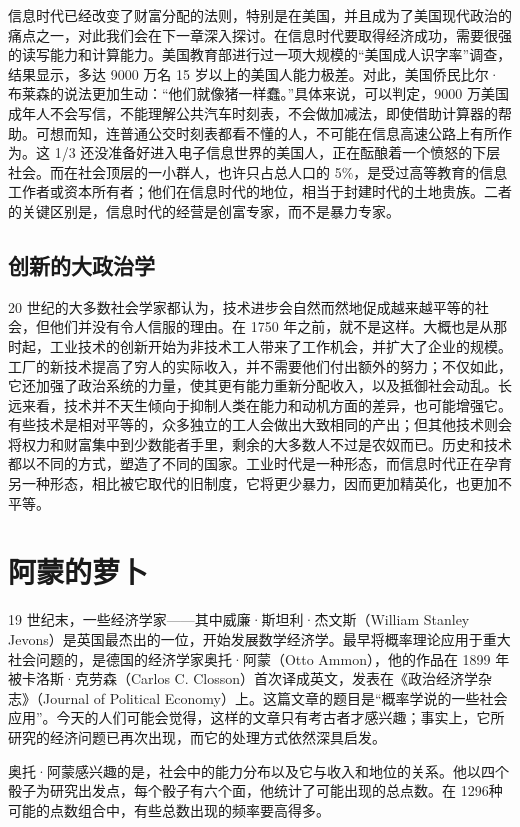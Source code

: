 信息时代已经改变了财富分配的法则，特别是在美国，并且成为了美国现代政治的痛点之一，对此我们会在下一章深入探讨。在信息时代要取得经济成功，需要很强的读写能力和计算能力。美国教育部进行过一项大规模的“美国成人识字率”调查，结果显示，多达 9000 万名 15 岁以上的美国人能力极差。对此，美国侨民比尔·布莱森的说法更加生动：“他们就像猪一样蠢。”具体来说，可以判定，9000 万美国成年人不会写信，不能理解公共汽车时刻表，不会做加减法，即使借助计算器的帮助。可想而知，连普通公交时刻表都看不懂的人，不可能在信息高速公路上有所作为。这 1/3 还没准备好进入电子信息世界的美国人，正在酝酿着一个愤怒的下层社会。而在社会顶层的一小群人，也许只占总人口的 5\%，是受过高等教育的信息工作者或资本所有者；他们在信息时代的地位，相当于封建时代的土地贵族。二者的关键区别是，信息时代的经营是创富专家，而不是暴力专家。

\subsection{创新的大政治学}
20 世纪的大多数社会学家都认为，技术进步会自然而然地促成越来越平等的社会，但他们并没有令人信服的理由。在 1750 年之前，就不是这样。大概也是从那时起，工业技术的创新开始为非技术工人带来了工作机会，并扩大了企业的规模。工厂的新技术提高了穷人的实际收入，并不需要他们付出额外的努力；不仅如此，它还加强了政治系统的力量，使其更有能力重新分配收入，以及抵御社会动乱。长远来看，技术并不天生倾向于抑制人类在能力和动机方面的差异，也可能增强它。有些技术是相对平等的，众多独立的工人会做出大致相同的产出；但其他技术则会将权力和财富集中到少数能者手里，剩余的大多数人不过是农奴而已。历史和技术都以不同的方式，塑造了不同的国家。工业时代是一种形态，而信息时代正在孕育另一种形态，相比被它取代的旧制度，它将更少暴力，因而更加精英化，也更加不平等。

\section{阿蒙的萝卜}
19 世纪末，一些经济学家——其中威廉·斯坦利·杰文斯（William Stanley Jevons）是英国最杰出的一位，开始发展数学经济学。最早将概率理论应用于重大社会问题的，是德国的经济学家奥托·阿蒙（Otto Ammon），他的作品在 1899 年被卡洛斯·克劳森（Carlos C. Closson）首次译成英文，发表在《政治经济学杂志》（Journal of Political Economy）上。这篇文章的题目是“概率学说的一些社会应用”。今天的人们可能会觉得，这样的文章只有考古者才感兴趣；事实上，它所研究的经济问题已再次出现，而它的处理方式依然深具启发。

奥托·阿蒙感兴趣的是，社会中的能力分布以及它与收入和地位的关系。他以四个骰子为研究出发点，每个骰子有六个面，他统计了可能出现的总点数。在 1296种可能的点数组合中，有些总数出现的频率要高得多。

